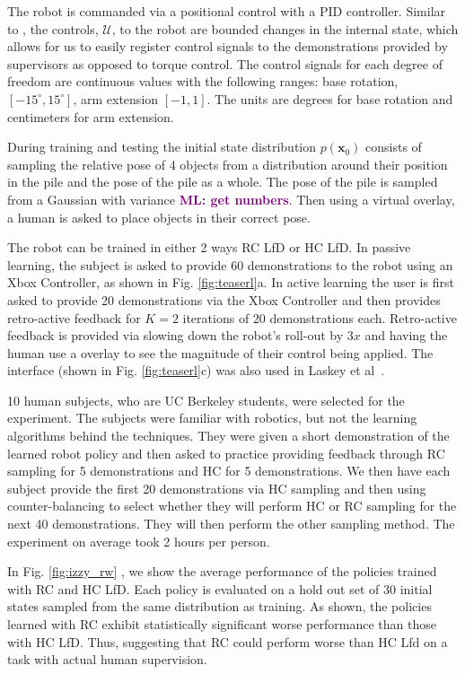 \documentclass[10pt, conference]{ieeeconf}      %
\newcommand{\bx}{\mathbf{x}}
\newcommand{\mlnote}[1]{\ifthenelse{ \boolean{include-notes}}%
 {\textcolor{purple}{\textbf{ML: #1}}}{}}
\begin{document}
The robot is commanded via a positional control with a  PID controller. Similar to \cite{laskeyshiv}, the controls, $\mathcal{U}$, to the robot are bounded changes in the internal state, which allows for us to easily register control signals to the demonstrations provided by supervisors as opposed to torque control. The control signals for each degree of freedom are continuous values with the following ranges: base rotation, $[-15^\circ,15^\circ]$, arm extension $[-1,1]$. The units are degrees for base rotation and centimeters for arm extension. 

During training and testing the initial state distribution $p(\bx_0)$ consists of sampling the relative pose of 4 objects from a distribution around their position in the pile and the pose of the pile as a whole. The pose of the pile is sampled from a Gaussian with variance \mlnote{get numbers}. Then using a virtual overlay,  a human is asked to place objects in their correct pose. 

The robot can be trained in either 2 ways RC LfD or HC LfD. In passive learning, the subject is asked to provide 60 demonstrations to the robot using an Xbox Controller, as shown in Fig. \ref{fig:teaserl}a. In active learning the user is first asked to provide 20 demonstrations via the Xbox Controller and then provides retro-active feedback for $K=2$ iterations of 20 demonstrations each. Retro-active feedback is provided via slowing down the robot's roll-out by $3x$ and having the human use a overlay to see the magnitude of their control being applied. The interface (shown in Fig. \ref{fig:teaserl}c) was also used in Laskey et al~\cite{laskeyrobot}.

10 human subjects, who are UC Berkeley students, were selected for the experiment. The subjects were familiar with robotics, but not the learning algorithms behind the techniques. They were given a short demonstration of the learned robot policy and then asked to practice providing feedback through RC sampling for 5 demonstrations and HC for 5 demonstrations. We then have each subject provide the first 20 demonstrations via HC sampling and then using counter-balancing to select whether they will perform HC or RC sampling for the next 40 demonstrations.  They will then perform the other sampling method. The experiment on average took 2 hours per person. 

In Fig. \ref{fig:izzy_rw} , we show the average performance of the policies trained with RC and HC LfD. Each policy is evaluated on a hold out set of 30 initial states sampled from the same distribution as training. As shown, the policies learned with RC exhibit statistically significant worse performance than those with HC LfD. Thus, suggesting that RC could perform worse than HC Lfd on a task with actual human supervision. 
\end{document}
